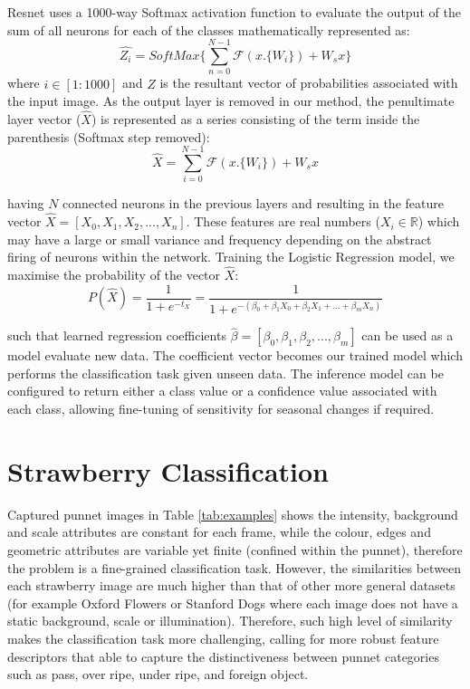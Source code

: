 \documentclass[fleqn,twoside,12pt]{report}
\begin{document}
Resnet uses a 1000-way Softmax activation function to evaluate the output of the sum of all neurons for each of the classes mathematically represented as:
\begin{equation}
\hat{Z_i} = SoftMax\Bigg \{ \sum_{n=0}^{N-1} \mathcal{F}(x.\{W_i\}) + W_s x \Bigg \}
\end{equation}
where $i \in [1:1000]$ and $\hat{Z}$ is the resultant vector of probabilities associated with the input image. As the output layer is removed in our method, the penultimate layer vector ($\hat{X}$) is represented as a series consisting of the term inside the parenthesis (Softmax step removed):
\begin{equation}
\hat{X} = \sum_{i=0}^{N-1} \mathcal{F}(x.\{W_i\}) + W_s x
\end{equation}

having $N$ connected neurons in the previous layers and resulting in the feature vector $\hat{X}=[X_0, X_1, X_2,..., X_n]$. These features are real numbers ($X_i\in \mathbb{R}$) which may have a large or small variance and frequency depending on the abstract firing of neurons within the network. Training the Logistic Regression model, we maximise the probability of the vector $\hat{X}$:
\begin{equation}
P(\hat{X}) = \frac{1}{1+e^{-t_X}} 
= \frac{1}{1+e^{-(\beta_0+\beta_1 X_0 + \beta_2         X_1+...+\beta_m X_n)}}
\end{equation}

such that learned regression coefficients $\hat{\beta}=[\beta_0, \beta_1, \beta_2,...,\beta_m]$ can be used as a model evaluate new data. The coefficient vector becomes our trained model which performs the classification task given unseen data. The inference model can be configured to return either a class value or a confidence value associated with each class, allowing fine-tuning of sensitivity for seasonal changes if required.



\section{Strawberry Classification}
\label{sec:strawberry_classification}

Captured punnet images in Table \ref{tab:examples} shows the intensity, background and scale attributes are constant for each frame, while the colour, edges and geometric attributes are variable yet finite (confined within the punnet), therefore the problem is a fine-grained classification task. However, the similarities between each strawberry image are much higher than that of other more general datasets (for example Oxford Flowers or Stanford Dogs where each image does not have a static background, scale or illumination). Therefore, such high level of similarity makes the classification task more challenging, calling for more robust feature descriptors that able to capture the distinctiveness between punnet categories such as pass, over ripe, under ripe, and foreign object.
\end{document}
